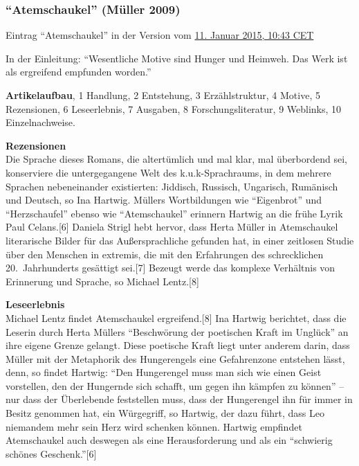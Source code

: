 \documentclass[fontsize=12pt]{scrartcl}
\begin{document}
\subsubsection{"`Atemschaukel"' (M\"uller 2009)}
\label{subsubsec:6.1.6}

Eintrag "`Atemschaukel"' in der Version vom \href{https://de.wikipedia.org/w/index.php?title=Atemschaukel\&oldid=137657441}{11. Januar 2015, 10:43 CET}

In der Einleitung: "`We\-sent\-liche Motive sind Hunger und Heimweh. Das Werk ist als ergreifend empfunden worden."'

\textbf{Artikelaufbau}, 1 Handlung, 2 Entstehung, 3 Erz\"ahlstruktur, 4 Motive, 5 Rezensionen, 6 Leseerlebnis, 7 Ausgaben, 8 For\-schungsli\-te\-ra\-tur, 9 Weblinks, 10 Einzelnachweise.

\textbf{Rezensionen}\\
Die Sprache dieses Romans, die altert\"umlich und mal klar, mal \"uberbordend sei, konserviere die untergegangene Welt des k.u.k-Sprachraums, in dem meh\-rere Sprachen nebeneinander existierten: Jiddisch, Russisch, Ungarisch, Rum\"anisch und Deutsch, so Ina Hartwig. M\"ullers Wortbildungen wie "`Eigenbrot"' und "`Herzschaufel"' ebenso wie "`Atemschaukel"' erinnern Hartwig an die fr\"uhe Lyrik Paul Celans.[6] Daniela Strigl hebt hervor, dass Herta M\"uller in Atemschaukel li\-te\-ra\-rische Bilder f\"ur das Au{\ss}ersprachliche gefunden hat, in einer zeitlosen Studie \"uber den Menschen in extremis, die mit den Erfah\-rungen des schrecklichen 20. Jahrhunderts ges\"attigt sei.[7] Bezeugt werde das komplexe Verh\"altnis von Erinnerung und Sprache, so Michael Lentz.[8]

\textbf{Leseerlebnis}\\
Michael Lentz findet Atemschaukel ergreifend.[8] Ina Hartwig berichtet, dass die Leserin durch Herta M\"ullers "`Beschw\"orung der poetischen Kraft im Ungl\"uck"' an ihre eigene Grenze gelangt. Diese poetische Kraft liegt unter anderem darin, dass M\"uller mit der Metaphorik des Hungerengels eine Gefahrenzone entstehen l\"asst, denn, so findet Hartwig: "`Den Hungerengel muss man sich wie einen Geist vorstellen, den der Hungernde sich schafft, um gegen ihn k\"ampfen zu k\"onnen"' -- nur dass der \"Uberlebende feststellen muss, dass der Hungerengel ihn f\"ur immer in Besitz genommen hat, ein W\"urgegriff, so Hartwig, der dazu f\"uhrt, dass Leo niemandem mehr sein Herz wird schenken k\"onnen. Hartwig empfindet Atemschaukel auch deswegen als eine He\-rausforderung und als ein "`schwierig sch\"ones Geschenk."'[6]
\end{document}
